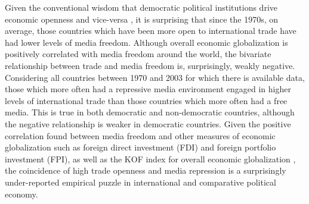 \documentclass[12pt,a4paper]{article}\usepackage[]{graphicx}\usepackage[]{color}
\begin{document}
\vspace{0.3cm}

Given the conventional wisdom that democratic political institutions drive economic openness \parencite{Milner:2005ci} and vice-versa \parencite{EICHENGREEN:2008gg}, it is surprising that since the 1970s, on average, those countries which have been more open to international trade have had lower levels of media freedom. Although overall economic globalization is positively correlated with media freedom around the world, the bivariate relationship between trade and media freedom is, surprisingly, weakly negative. Considering all countries between 1970 and 2003 for which there is available data, those which more often had a repressive media environment engaged in higher levels of international trade than those countries which more often had a free media. This is true in both democratic and non-democratic countries, although the negative relationship is weaker in democratic countries. Given the positive correlation found between media freedom and other measures of economic globalization such as foreign direct investment (FDI) and foreign portfolio investment (FPI), as well as the KOF index for overall economic globalization \parencite{Dreher:2008dg}, the coincidence of high trade openness and media repression is a surprisingly under-reported empirical puzzle in international and comparative political economy.
\end{document}
